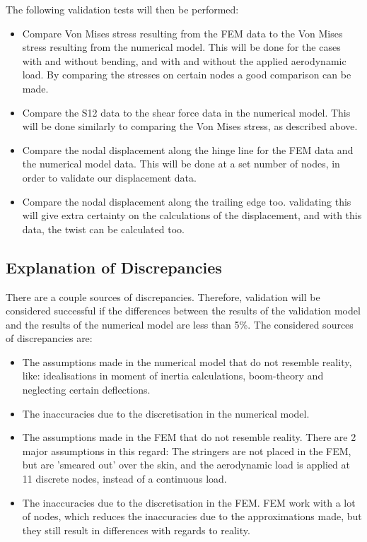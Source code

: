 \noindent The following validation tests will then be performed:
\begin{itemize}
    \item Compare Von Mises stress resulting from the FEM data to the Von Mises stress resulting from the numerical model. This will be done for the cases with and without bending, and with and without the applied aerodynamic load. By comparing the stresses on certain nodes a good comparison can be made.
    \item Compare the S12 data to the shear force data in the numerical model. This will be done similarly to comparing the Von Mises stress, as described above.
    \item Compare the nodal displacement along the hinge line for the FEM data and the numerical model data. This will be done at a set number of nodes, in order to validate our displacement data.
    \item Compare the nodal displacement along the trailing edge too. validating this will give extra certainty on the calculations of the displacement, and with this data, the twist can be calculated too.
\end{itemize}

\subsection{Explanation of Discrepancies}
There are a couple sources of discrepancies. Therefore, validation will be considered successful if the differences between the results of the validation model and the results of the numerical model are less than 5\%. The considered sources of discrepancies are:
\begin{itemize}
    \item The assumptions made in the numerical model that do not resemble reality, like: idealisations in moment of inertia calculations, boom-theory and neglecting certain deflections.
    \item The inaccuracies due to the discretisation in the numerical model.
    \item The assumptions made in the FEM that do not resemble reality. There are 2 major assumptions in this regard: The stringers are not placed in the FEM, but are 'smeared out' over the skin, and the aerodynamic load is applied at 11 discrete nodes, instead of a continuous load.
    \item The inaccuracies due to the discretisation in the FEM. FEM work with a lot of nodes, which reduces the inaccuracies due to the approximations made, but they still result in differences with regards to reality.
\end{itemize}




